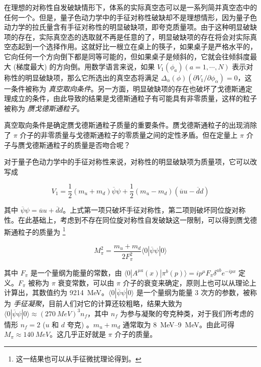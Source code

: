 \documentclass[oneside,a4paper,openany,11pt]{ctexbook}
\begin{document}
在理想的对称性自发破缺情形下，体系的实际真空态可以是一系列简并真空态中的任何一个。但是，量子色动力学中的手征对称性破缺却不是理想情形，因为量子色动力学的拉氏量含有手征对称性的明显破缺项，即夸克质量项。由于这种明显破缺项的存在，实际真空态的选取就不再是任意的了，明显破缺项的存在将会对实际真空态起到一个选择作用。这就好比一根立在桌上的筷子，如果桌子是严格水平的，它向任何一个方向倒下都是同等可能的，但如果桌子是倾斜的，它就会往倾斜度最大 (梯度最大) 的方向倒。用数学语言来说，如果 $V_1(\phi_a) (a=1, \cdots, N)$ 表示对称性的明显破缺项，那么它所选出的真空态将满足 $\Delta_\alpha(\phi) (\partial V_1/\partial \phi_\alpha)=0$，这一条件被称为 \emph{真空取向条件}。另一方面，明显破缺项的存在也破坏了戈德斯通定理成立的条件，由此导致的结果是戈德斯通粒子有可能具有非零质量，这样的粒子被称为 \emph{赝戈德斯通粒子}。

真空取向条件是确定赝戈德斯通粒子质量的重要条件。赝戈德斯通粒子的出现消除了 $\pi$ 介子的非零质量与戈德斯通粒子的零质量之间的定性矛盾。但在定量上 $\pi$ 介子与赝戈德斯通粒子的质量是否吻合呢？

对于量子色动力学中的手征对称性来说，对称性的明显破缺项为质量项，它可以改写成

\begin{equation}
    V_1 = \frac{1}{2} (m_u+m_d) \overline{\psi} \psi + \frac{1}{2} (m_u-m_d) (\overline{u}u-\overline{d}d)
\end{equation}

\noindent 其中 $\overline{\psi}\psi=\overline{u}u+\overline{d}d$。上式第一项只破坏手征对称性，第二项则破坏同位旋对称性。在此基础上，考虑到不存在同位旋对称性自发破缺这一限制，可以得到赝戈德斯通粒子的质量为 \footnote{这一结果也可以从手征微扰理论得到。}

\begin{equation}
    M_{\pi}^2 = \frac{m_u+m_d}{2 F_{\pi}^2} \langle 0 | \overline{\psi}\psi | 0\rangle
\end{equation}

\noindent 其中 $F_\pi$ 是一个量纲为能量的常数，由 $\langle 0 | A^{\mu a}(x) | \pi^b(p) \rangle = i p^\mu F_\pi \delta^{ab} e^{-ipx}$ 定义。$F_\pi$ 被称为 $\pi$ 衰变常数，可以由 $\pi$ 介子的衰变来确定，原则上也可以从理论上计算出，其数值约为 \qty{9214}{MeV}。$\langle 0 | \overline{\psi}\psi | 0 \rangle$ 是一个量纲为能量 $3$ 次方的参数，被称为 \emph{手征凝聚}，目前人们对它的计算还较粗略，结果大致为 $\langle 0 | \overline{\psi}\psi | 0 \rangle \approx (\qty{270}{MeV})^3 n_f$，其中 $n_f$ 为参与凝聚的夸克种类，对于我们所考虑的情形 $n_f=2$ ($u$ 和 $d$ 夸克) 。$m_u+m_d$ 通常取为 \qtyrange{8}{9}{MeV}。由此可得 $M_\pi\approx\qty{140}{MeV}$。这几乎正好就是 $\pi$ 介子的质量。
\end{document}

